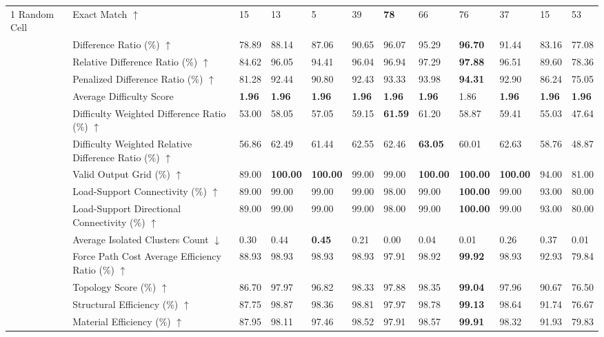 \begin{table}[!h]
{\begin{tabular}{llllllllllll}
\midrule
1 Random Cell & Exact Match $\uparrow$ & 15 & 13 & 5 & 39 & \textbf{78} & 66 & 76 & 37 & 15 & 53 \\
 & Difference Ratio (\%) $\uparrow$ & 78.89 & 88.14 & 87.06 & 90.65 & 96.07 & 95.29 & \textbf{96.70} & 91.44 & 83.16 & 77.08 \\
 & Relative Difference Ratio (\%) $\uparrow$ & 84.62 & 96.05 & 94.41 & 96.04 & 96.94 & 97.29 & \textbf{97.88} & 96.51 & 89.60 & 78.36 \\
 & Penalized Difference Ratio (\%) $\uparrow$ & 81.28 & 92.44 & 90.80 & 92.43 & 93.33 & 93.98 & \textbf{94.31} & 92.90 & 86.24 & 75.05 \\
 & Average Difficulty Score & \textbf{1.96} & \textbf{1.96} & \textbf{1.96} & \textbf{1.96} & \textbf{1.96} & \textbf{1.96} & 1.86 & \textbf{1.96} & \textbf{1.96} & \textbf{1.96} \\
 & Difficulty Weighted Difference Ratio (\%) $\uparrow$ & 53.00 & 58.05 & 57.05 & 59.15 & \textbf{61.59} & 61.20 & 58.87 & 59.41 & 55.03 & 47.64 \\
 & Difficulty Weighted Relative Difference Ratio (\%) $\uparrow$ & 56.86 & 62.49 & 61.44 & 62.55 & 62.46 & \textbf{63.05} & 60.01 & 62.63 & 58.76 & 48.87 \\
 & Valid Output Grid (\%) $\uparrow$ & 89.00 & \textbf{100.00} & \textbf{100.00} & 99.00 & 99.00 & \textbf{100.00} & \textbf{100.00} & \textbf{100.00} & 94.00 & 81.00 \\
 & Load-Support Connectivity (\%) $\uparrow$ & 89.00 & 99.00 & 99.00 & 99.00 & 98.00 & 99.00 & \textbf{100.00} & 99.00 & 93.00 & 80.00 \\
 & Load-Support Directional Connectivity (\%) $\uparrow$ & 89.00 & 99.00 & 99.00 & 99.00 & 98.00 & 99.00 & \textbf{100.00} & 99.00 & 93.00 & 80.00 \\
 & Average Isolated Clusters Count $\downarrow$ & 0.30 & 0.44 & \textbf{0.45} & 0.21 & 0.00 & 0.04 & 0.01 & 0.26 & 0.37 & 0.01 \\
 & Force Path Cost Average Efficiency Ratio (\%) $\uparrow$ & 88.93 & 98.93 & 98.93 & 98.93 & 97.91 & 98.92 & \textbf{99.92} & 98.93 & 92.93 & 79.84 \\
 & Topology Score (\%) $\uparrow$ & 86.70 & 97.97 & 96.82 & 98.33 & 97.88 & 98.35 & \textbf{99.04} & 97.96 & 90.67 & 76.50 \\
 & Structural Efficiency (\%) $\uparrow$ & 87.75 & 98.87 & 98.36 & 98.81 & 97.97 & 98.78 & \textbf{99.13} & 98.64 & 91.74 & 76.67 \\
 & Material Efficiency (\%) $\uparrow$ & 87.95 & 98.11 & 97.46 & 98.52 & 97.91 & 98.57 & \textbf{99.91} & 98.32 & 91.93 & 79.83 \\

\end{tabular}}
\end{table}

